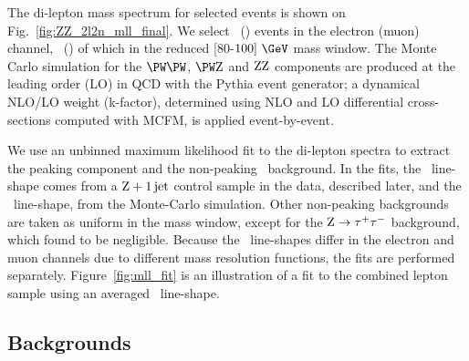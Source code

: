 The di-lepton mass spectrum for selected events is shown on Fig.~\ref{fig:ZZ_2l2n_mll_final}.  We select \NELE\ (\NMUO) events in the electron (muon) channel, \NELEWIN\ (\NMUOWIN) of which in the reduced $[80$-$100]~\GeV$ mass window. The Monte Carlo simulation for the $\WW$, $\WZ$ and $\mathrm{Z}\mathrm{Z}$ components are produced at the leading order (LO) in QCD with the Pythia event generator; a dynamical NLO/LO weight (k-factor), determined using NLO and LO differential cross-sections computed with MCFM, is applied event-by-event.  

We use an unbinned maximum likelihood fit to the di-lepton spectra to extract the peaking component and the non-peaking \WW\ background. In the fits, the \PZ\ line-shape comes from a $\mathrm{Z}+\mathrm{1\,jet}$ control sample in the data, described later, and the \WW\ line-shape, from the Monte-Carlo simulation. Other non-peaking backgrounds are taken as uniform in the mass window, except for the $\mathrm{Z}\to\tau^+\tau^-$ background, which found to be negligible. Because the \PZ\ line-shapes differ in the electron and muon channels due to different mass resolution functions, the fits are performed separately.  Figure~\ref{fig:mll_fit} is an illustration of a fit to the combined lepton sample using an averaged \PZ\ line-shape.   



\subsection{Backgrounds}

